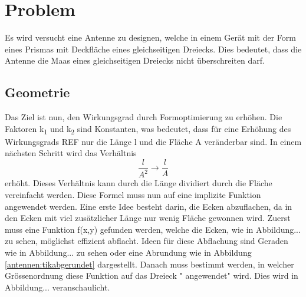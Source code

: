 %
%
% 
%
%

\section{Problem\label{antennen:problemstellung}}
 Es wird versucht eine Antenne zu designen, welche in einem Gerät mit der Form eines Prismas mit Deckfläche eines gleichseitigen Dreiecks. Dies bedeutet, dass die Antenne die Maas eines gleichseitigen Dreiecks nicht überschreiten darf.
\subsection{Geometrie\label{antennen:Geom}}
Das Ziel ist nun, den Wirkungsgrad durch Formoptimierung zu erhöhen. Die Faktoren k\textsubscript{1} und k\textsubscript{2} sind Konstanten, was bedeutet, dass für eine Erhöhung des Wirkungsgrads REF nur die Länge l und die Fläche A veränderbar sind. In einem nächsten Schritt wird das Verhältnis
\begin{equation}
	\frac{l}{A^2} \rightarrow \frac{l}{A}
	\label{antennen:Verhältnis}
\end{equation}
erhöht. Dieses Verhältnis kann durch die Länge dividiert durch die Fläche vereinfacht werden. Diese Formel muss nun auf eine implizite Funktion angewendet werden. Eine erste Idee besteht darin, die Ecken abzuflachen, da in den Ecken mit viel zusätzlicher Länge nur wenig Fläche gewonnen wird. Zuerst muss eine Funktion f(x,y) gefunden werden, welche die Ecken, wie in Abbildung... zu sehen, möglichst effizient abflacht. Ideen für diese Abflachung sind Geraden wie in Abbildung... zu sehen oder eine Abrundung wie in Abbildung \ref{antennen:tikabgerundet} dargestellt. Danach muss bestimmt werden, in welcher Grössenordnung diese Funktion auf das Dreieck " angewendet"  wird. Dies wird in Abbildung... veranschaulicht.


